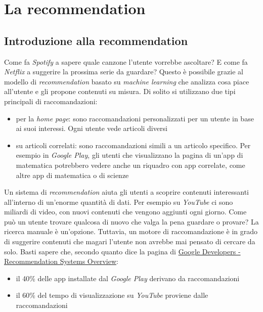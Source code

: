 \chapter{La recommendation}

\section{Introduzione alla recommendation}

Come fa \textit{Spotify} a sapere quale canzone l'utente vorrebbe ascoltare? E come fa \textit{Netflix} a suggerire la prossima serie da guardare? Questo è possibile grazie al modello di \textit{recommendation} basato su \textit{machine learning} che analizza cosa piace all'utente e gli propone contenuti su misura. Di solito si utilizzano due tipi principali di raccomandazioni:

\begin{itemize}
    \item per la \textit{home page}: sono raccomandazioni personalizzati per un utente in base ai suoi interessi. Ogni utente vede articoli diversi
    \item su articoli correlati: sono raccomandazioni simili a un articolo specifico. Per esempio in \textit{Google Play}, gli utenti che visualizzano la pagina di un'app di matematica potrebbero vedere anche un riquadro con app correlate, come altre app di matematica o di scienze
\end{itemize}

Un sistema di \textit{recommendation} aiuta gli utenti a scoprire contenuti interessanti all'interno di un'enorme quantità di dati. Per esempio su \textit{YouTube} ci sono miliardi di video, con nuovi contenuti che vengono aggiunti ogni giorno. Come può un utente trovare qualcosa di nuovo che valga la pena guardare o provare? La ricerca manuale è un'opzione. Tuttavia, un motore di raccomandazione è in grado di suggerire contenuti che magari l'utente non avrebbe mai pensato di cercare da solo. Basti sapere che, secondo quanto dice la pagina di \href{https://developers.google.com/machine-learning/recommendation/overview}{Google Developers - Recommendation Systems Overview}:

\begin{itemize}
    \item il 40\% delle app installate dal \textit{Google Play} derivano da raccomandazioni
    \item il 60\% del tempo di visualizzazione su \textit{YouTube} proviene dalle raccomandazioni
\end{itemize}


